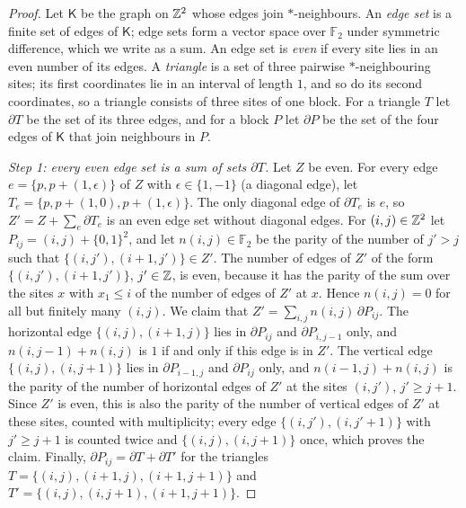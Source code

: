 \begin{proof}
Let $\mathsf K$ be the graph on $\mathbb{Z}^2$ whose edges join $*$-neighbours. An \emph{edge set} is a finite set of edges of $\mathsf K$; edge sets form a vector space over $\mathbb F_2$ under symmetric difference, which we write as a sum. An edge set is \emph{even} if every site lies in an even number of its edges. A \emph{triangle} is a set of three pairwise $*$-neighbouring sites; its first coordinates lie in an interval of length $1$, and so do its second coordinates, so a triangle consists of three sites of one block. For a triangle $T$ let $\partial T$ be the set of its three edges, and for a block $P$ let $\partial P$ be the set of the four edges of $\mathsf K$ that join neighbours in $P$.

\emph{Step 1: every even edge set is a sum of sets $\partial T$.} Let $Z$ be even. For every edge $e = \{p, p + (1, \epsilon)\}$ of $Z$ with $\epsilon \in \{1, -1\}$ (a diagonal edge), let $T_e = \{p, p + (1, 0), p + (1, \epsilon)\}$. The only diagonal edge of $\partial T_e$ is $e$, so $Z' = Z + \sum_e \partial T_e$ is an even edge set without diagonal edges. For $(i, j) \in \mathbb{Z}^2$ let $P_{ij} = (i, j) + \{0, 1\}^2$, and let $n(i, j) \in \mathbb F_2$ be the parity of the number of $j' > j$ such that $\{(i, j'), (i + 1, j')\} \in Z'$. The number of edges of $Z'$ of the form $\{(i, j'), (i + 1, j')\}$, $j' \in \mathbb{Z}$, is even, because it has the parity of the sum over the sites $x$ with $x_1 \le i$ of the number of edges of $Z'$ at $x$. Hence $n(i, j) = 0$ for all but finitely many $(i, j)$. We claim that $Z' = \sum_{i, j} n(i, j) \, \partial P_{ij}$. The horizontal edge $\{(i, j), (i + 1, j)\}$ lies in $\partial P_{ij}$ and $\partial P_{i, j - 1}$ only, and $n(i, j - 1) + n(i, j)$ is $1$ if and only if this edge is in $Z'$. The vertical edge $\{(i, j), (i, j + 1)\}$ lies in $\partial P_{i - 1, j}$ and $\partial P_{ij}$ only, and $n(i - 1, j) + n(i, j)$ is the parity of the number of horizontal edges of $Z'$ at the sites $(i, j')$, $j' \ge j + 1$. Since $Z'$ is even, this is also the parity of the number of vertical edges of $Z'$ at these sites, counted with multiplicity; every edge $\{(i, j'), (i, j' + 1)\}$ with $j' \ge j + 1$ is counted twice and $\{(i, j), (i, j + 1)\}$ once, which proves the claim. Finally, $\partial P_{ij} = \partial T + \partial T'$ for the triangles $T = \{(i, j), (i + 1, j), (i + 1, j + 1)\}$ and $T' = \{(i, j), (i, j + 1), (i + 1, j + 1)\}$.


\end{proof}
